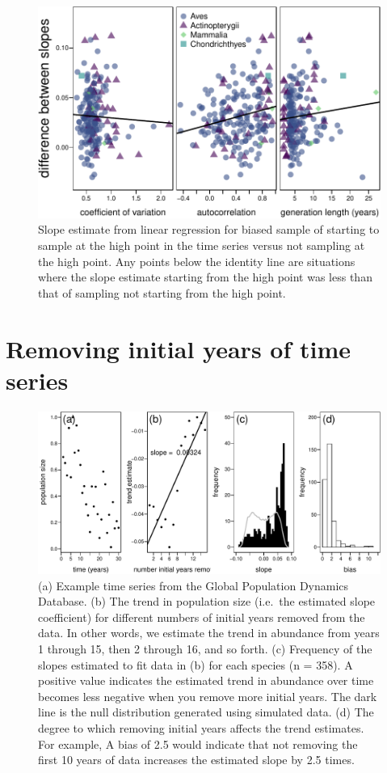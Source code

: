 \documentclass[]{article}
\begin{document}
\begin{figure}
\centering
\includegraphics{Empirical_Investigation_files/figure-latex/unnamed-chunk-6-1.pdf}
\caption{Slope estimate from linear regression for biased sample of
starting to sample at the high point in the time series versus not
sampling at the high point. Any points below the identity line are
situations where the slope estimate starting from the high point was
less than that of sampling not starting from the high
point.\label{fig:GPDD_explanatory}}
\end{figure}

\pagebreak

\section{Removing initial years of time series}

\begin{figure}
\centering
\includegraphics{Empirical_Investigation_files/figure-latex/unnamed-chunk-8-1.pdf}
\caption{(a) Example time series from the Global Population Dynamics
Database. (b) The trend in population size (i.e.~the estimated slope
coefficient) for different numbers of initial years removed from the
data. In other words, we estimate the trend in abundance from years 1
through 15, then 2 through 16, and so forth. (c) Frequency of the slopes
estimated to fit data in (b) for each species (n = 358). A positive
value indicates the estimated trend in abundance over time becomes less
negative when you remove more initial years. The dark line is the null
distribution generated using simulated data. (d) The degree to which
removing initial years affects the trend estimates. For example, A bias
of 2.5 would indicate that not removing the first 10 years of data
increases the estimated slope by 2.5 times.
\label{fig:removing_initial_years}}
\end{figure}
\end{document}

